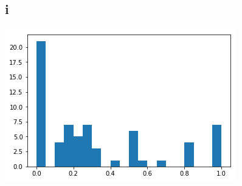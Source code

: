 \documentclass[12pt]{article}
\begin{document}
\subsection*{i}\includegraphics[scale = 0.7]{25.png}
\pagebreak
\end{document}
